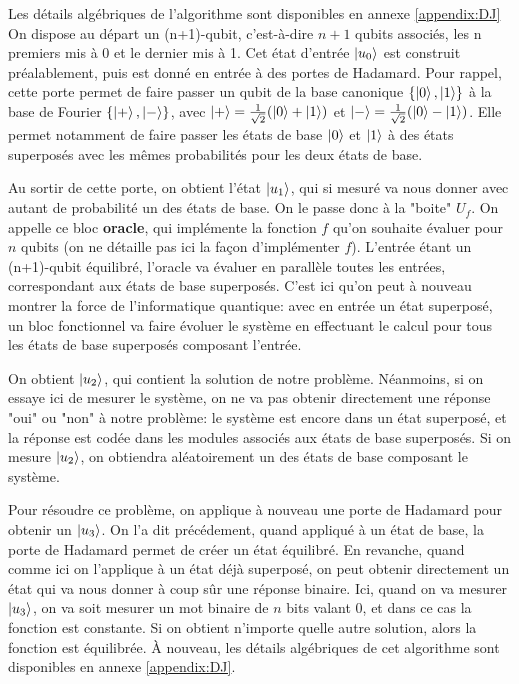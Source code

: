 Les détails algébriques de l'algorithme sont disponibles en annexe \ref{appendix:DJ}
\medbreak
On dispose au départ un (n+1)-qubit, c'est-à-dire $n+1$ qubits associés, les n premiers mis à 0 et le dernier mis à 1. Cet état d'entrée $\ket{u_0}$ est construit préalablement, puis est donné en entrée à des portes de Hadamard. Pour rappel, cette porte permet de faire passer un qubit de la base canonique $\{\ket{0}, \ket{1}\}$ à la base de Fourier $\{\ket{+}, \ket{-}\}$, avec $\ket{+} = \frac{1}{\sqrt{2}} (\ket{0} + \ket{1})$ et $\ket{-} = \frac{1}{\sqrt{2}} (\ket{0} - \ket{1})$. Elle permet notamment de faire passer les états de base $\ket{0}$ et $\ket{1}$ à des états superposés avec les mêmes probabilités pour les deux états de base.

Au sortir de cette porte, on obtient l'état $\ket{u_1}$, qui si mesuré va nous donner avec autant de probabilité un des états de base. On le passe donc à la "boite" $U_f$. On appelle ce bloc \textbf{oracle}, qui implémente la fonction $f$ qu'on souhaite évaluer pour $n$ qubits (on ne détaille pas ici la façon d'implémenter $f$). L'entrée étant un (n+1)-qubit équilibré, l'oracle va évaluer en parallèle toutes les entrées, correspondant aux états de base superposés. C'est ici qu'on peut à nouveau montrer la force de l'informatique quantique: avec en entrée un état superposé, un bloc fonctionnel va faire évoluer le système en effectuant le calcul pour tous les états de base superposés composant l'entrée.

On obtient $\ket{u_2}$, qui contient la solution de notre problème. Néanmoins, si on essaye ici de mesurer le système, on ne va pas obtenir directement une réponse "oui" ou "non" à notre problème: le système est encore dans un état superposé, et la réponse est codée dans les modules associés aux états de base superposés. Si on mesure $\ket{u_2}$, on obtiendra aléatoirement un des états de base composant le système.

Pour résoudre ce problème, on applique à nouveau une porte de Hadamard pour obtenir un $\ket{u_3}$. On l'a dit précédement, quand appliqué à un état de base, la porte de Hadamard permet de créer un état équilibré. En revanche, quand comme ici on l'applique à un état déjà superposé, on peut obtenir directement un état qui va nous donner à coup sûr une réponse binaire. Ici, quand on va mesurer $\ket{u_3}$, on va soit mesurer un mot binaire de $n$ bits valant 0, et dans ce cas la fonction est constante. Si on obtient n'importe quelle autre solution, alors la fonction est équilibrée. \`A nouveau, les détails algébriques de cet algorithme sont disponibles en annexe \ref{appendix:DJ}.

